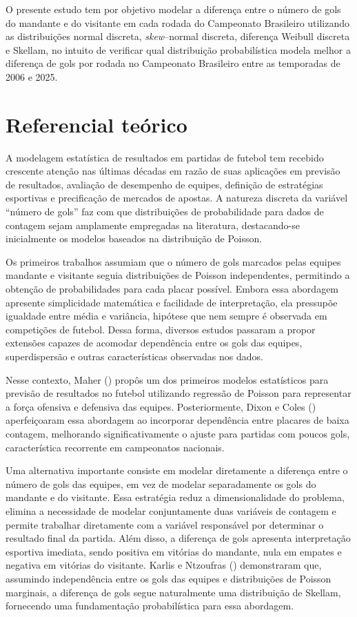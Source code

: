 \documentclass[12pt,a4paper]{article}\usepackage[]{graphicx}\usepackage[]{xcolor}
\begin{document}
O presente estudo tem por objetivo modelar a diferença entre o número de gols do mandante e do visitante em cada rodada do Campeonato Brasileiro utilizando as distribuições normal discreta, \textit{skew}--normal discreta, diferença Weibull discreta e Skellam, no intuito de verificar qual distribuição probabilística modela melhor a diferença de gols por rodada no Campeonato Brasileiro entre as temporadas de 2006 e 2025.
\section{Referencial teórico}

A modelagem estatística de resultados em partidas de futebol tem recebido crescente atenção nas últimas décadas em razão de suas aplicações em previsão de resultados, avaliação de desempenho de equipes, definição de estratégias esportivas e precificação de mercados de apostas. A natureza discreta da variável ``número de gols'' faz com que distribuições de probabilidade para dados de contagem sejam amplamente empregadas na literatura, destacando-se inicialmente os modelos baseados na distribuição de Poisson.

Os primeiros trabalhos assumiam que o número de gols marcados pelas equipes mandante e visitante seguia distribuições de Poisson independentes, permitindo a obtenção de probabilidades para cada placar possível. Embora essa abordagem apresente simplicidade matemática e facilidade de interpretação, ela pressupõe igualdade entre média e variância, hipótese que nem sempre é observada em competições de futebol. Dessa forma, diversos estudos passaram a propor extensões capazes de acomodar dependência entre os gols das equipes, superdispersão e outras características observadas nos dados.

Nesse contexto, Maher (\citeyear{maher1982}) propôs um dos primeiros modelos estatísticos para previsão de resultados no futebol utilizando regressão de Poisson para representar a força ofensiva e defensiva das equipes. Posteriormente, Dixon e Coles (\citeyear{Dixon1997}) aperfeiçoaram essa abordagem ao incorporar dependência entre placares de baixa contagem, melhorando significativamente o ajuste para partidas com poucos gols, característica recorrente em campeonatos nacionais.

Uma alternativa importante consiste em modelar diretamente a diferença entre o número de gols das equipes, em vez de modelar separadamente os gols do mandante e do visitante. Essa estratégia reduz a dimensionalidade do problema, elimina a necessidade de modelar conjuntamente duas variáveis de contagem e permite trabalhar diretamente com a variável responsável por determinar o resultado final da partida. Além disso, a diferença de gols apresenta interpretação esportiva imediata, sendo positiva em vitórias do mandante, nula em empates e negativa em vitórias do visitante. Karlis e Ntzoufras (\citeyear{Karlis2009}) demonstraram que, assumindo independência entre os gols das equipes e distribuições de Poisson marginais, a diferença de gols segue naturalmente uma distribuição de Skellam, fornecendo uma fundamentação probabilística para essa abordagem.
\end{document}
